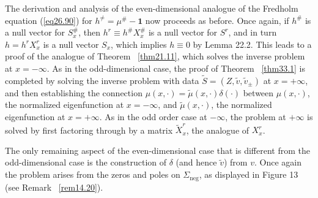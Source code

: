 \documentclass{surv-l}
\theoremstyle{plain}
\theoremstyle{definition}
\numberwithin{equation}{chapter}
\begin{document}
The derivation and analysis of the even-dimensional analogue of the Fredholm equation (\ref{eq26.90}) for $h^{\neq}=\mu^{\#}-\mathbf{1}$ now proceeds as before. Once again, if $ h^{\#}$ is a null vector for $ S_{x}^\#$, then $h^{r}\equiv h^{\#}X_{x}^{\#}$ is a null vector for $S^{r}$, and in turn $h=h^{r}X_{x}^{r}$ is a null vector $S_{x}$, which implies $h\equiv 0$ by Lemma 22.2. This leads to a proof of the analogue of Theorem ~\ref{thm21.11}, which solves the inverse problem at $ x=-\infty$. As in the odd-dimensional case, the proof of Theorem ~\ref{thm33.1} is completed by solving the inverse problem with data $\tilde{S}=(Z,\tilde{v},\tilde{v}_{\pm})$ at $ x=+\infty$, and then establishing the connection $\mu(x, \cdot)=\tilde{\mu}(x, \cdot)\delta(\cdot)$ between $\mu(x, \cdot)$, the normalized eigenfunction at $x=-\infty$, and $\tilde{\mu}(x, \cdot)$, the normalized eigenfunction at $ x=+\infty$. As in the odd order case at $-\infty$, the problem at $+\infty$ is solved by first factoring through by a matrix $\tilde{X}_{x}^{r}$, the analogue of $X_{x}^{r}$.

The only remaining aspect of the even-dimensional case that is different from the odd-dimensional case is the construction of $\delta$ (and hence $\tilde{v}$) from $v$. Once again the problem arises from the zeros and poles on $\Sigma_{\mathrm{neg}}$, as displayed in Figure 13 (see Remark ~\ref{rem14.20}).
\end{document}
